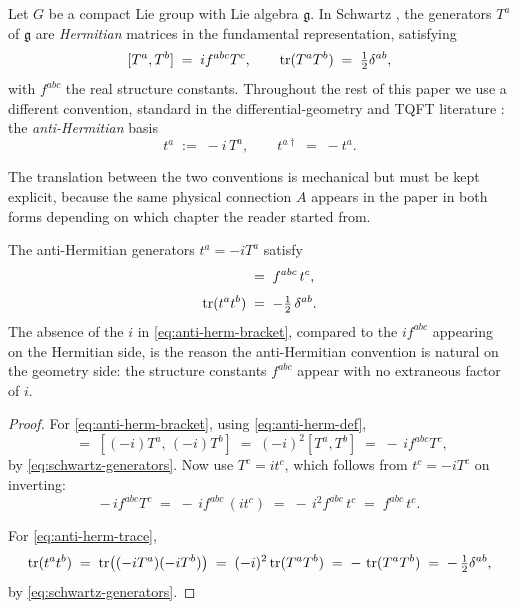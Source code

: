 Let $G$ be a compact Lie group with Lie algebra $\mathfrak{g}$. In Schwartz \cite{Schwartz2014QFT}, the generators $T^a$ of $\mathfrak{g}$ are \emph{Hermitian} matrices in the fundamental representation, satisfying
\begin{equation}\label{eq:schwartz-generators}
[T^a, T^b] \;=\; i f^{abc} T^c, \qquad \operatorname{tr}(T^a T^b) \;=\; \tfrac{1}{2} \delta^{ab},
\end{equation}
with $f^{abc}$ the real structure constants. Throughout the rest of this paper we use a different convention, standard in the differential-geometry and TQFT literature \cite{Freed1995CSnotes, Witten1989Jones}: the \emph{anti-Hermitian} basis
\begin{equation}\label{eq:anti-herm-def}
t^a \;:=\; -i\, T^a, \qquad t^{a\dagger} \;=\; -t^a.
\end{equation}

The translation between the two conventions is mechanical but must be kept explicit, because the same physical connection $A$ appears in the paper in both forms depending on which chapter the reader started from.

\begin{proposition}\label{prop:anti-herm-identities}
The anti-Hermitian generators $t^a = -iT^a$ satisfy
\begin{align}
[t^a, t^b] &\;=\; f^{abc}\, t^c, \label{eq:anti-herm-bracket}\\[1mm]
\tr(t^a t^b) &\;=\; -\tfrac{1}{2}\,\delta^{ab}. \label{eq:anti-herm-trace}
\end{align}
The absence of the $i$ in \eqref{eq:anti-herm-bracket}, compared to the $i f^{abc}$ appearing on the Hermitian side, is the reason the anti-Hermitian convention is natural on the geometry side: the structure constants $f^{abc}$ appear with no extraneous factor of $i$.
\end{proposition}

\begin{proof}
For \eqref{eq:anti-herm-bracket}, using \eqref{eq:anti-herm-def},
\begin{equation*}
[t^a, t^b] \;=\; [(-i)T^a,\, (-i)T^b] \;=\; (-i)^2 [T^a, T^b] \;=\; -\, i f^{abc} T^c,
\end{equation*}
by \eqref{eq:schwartz-generators}. Now use $T^c = it^c$, which follows from $t^c = -iT^c$ on inverting:
\begin{equation*}
-\,i f^{abc} T^c \;=\; -\,i f^{abc}\,(i t^c) \;=\; -\,i^2 f^{abc}\, t^c \;=\; f^{abc}\, t^c.
\end{equation*}

For \eqref{eq:anti-herm-trace},
\begin{equation*}
\operatorname{tr}(t^a t^b) \;=\; \operatorname{tr}\!\left((-iT^a)(-iT^b)\right) \;=\; (-i)^2 \operatorname{tr}(T^a T^b) \;=\; -\,\operatorname{tr}(T^a T^b) \;=\; -\,\tfrac{1}{2}\delta^{ab},
\end{equation*}
by \eqref{eq:schwartz-generators}.
\end{proof}

